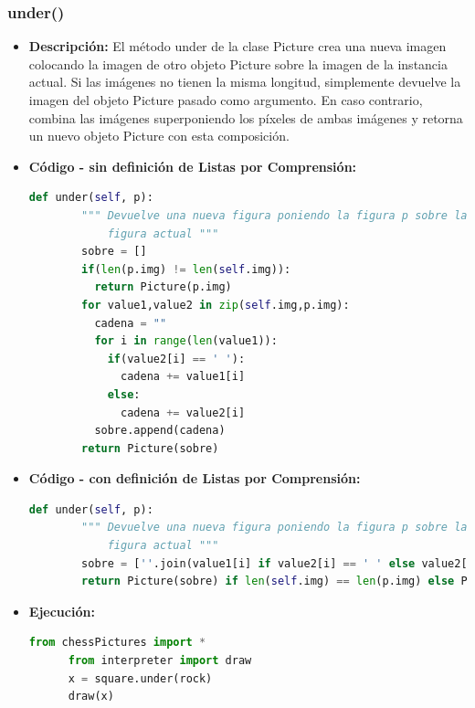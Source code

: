 \documentclass{article}
\begin{document}
  \subsubsection{under()}
  \begin{itemize}
    \item \textbf{Descripción: }El método under de la clase Picture crea una nueva imagen colocando la 
      imagen de otro objeto Picture sobre la imagen de la instancia actual. Si las imágenes no tienen la misma longitud, 
      simplemente devuelve la imagen del objeto Picture pasado como argumento. En caso contrario, combina las imágenes superponiendo 
      los píxeles de ambas imágenes y retorna un nuevo objeto Picture con esta composición.
    \newpage
    \item \textbf{Código - sin definición de Listas por Comprensión:}
    \begin{lstlisting}[language=Python, caption=Método under()]
      def under(self, p):
        """ Devuelve una nueva figura poniendo la figura p sobre la
            figura actual """
        sobre = []
        if(len(p.img) != len(self.img)):
          return Picture(p.img)
        for value1,value2 in zip(self.img,p.img):
          cadena = ""
          for i in range(len(value1)):
            if(value2[i] == ' '):
              cadena += value1[i]
            else:
              cadena += value2[i]
          sobre.append(cadena)
        return Picture(sobre)
    \end{lstlisting}
    \item \textbf{Código - con definición de Listas por Comprensión:}
    \begin{lstlisting}[language=Python, caption=Método under()]
      def under(self, p):
        """ Devuelve una nueva figura poniendo la figura p sobre la
            figura actual """
        sobre = [''.join(value1[i] if value2[i] == ' ' else value2[i] for i in range(len(value1))) for value1,value2 in zip(self.img,p.img)]
        return Picture(sobre) if len(self.img) == len(p.img) else Picture(p.img)
    \end{lstlisting}
    \item \textbf{Ejecución:}
    \begin{lstlisting}[language=Python, caption=Prueba under()]
      from chessPictures import *
      from interpreter import draw
      x = square.under(rock)
      draw(x)
    \end{lstlisting}
    \begin{figure}[H]
      \centering

\end{figure}
\end{itemize}
\end{document}
